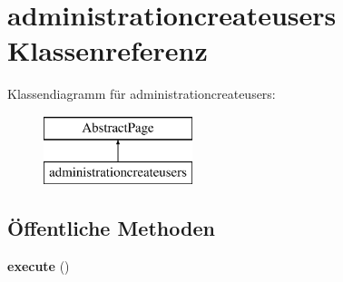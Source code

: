 \hypertarget{classadministrationcreateusers}{}\section{administrationcreateusers Klassenreferenz}
\label{classadministrationcreateusers}
Klassendiagramm für administrationcreateusers\+:\begin{figure}[H]
\begin{center}
\leavevmode
\includegraphics[height=2.000000cm]{classadministrationcreateusers}
\end{center}
\end{figure}
\subsection*{Öffentliche Methoden}
\begin{DoxyCompactItemize}
\item 
\mbox{\label{classadministrationcreateusers_af126ac5d6abdc158d61af9c97fac61ca}} 
{\bfseries execute} ()
\end{DoxyCompactItemize}
